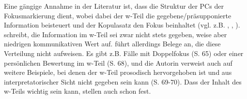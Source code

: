 Eine gängige Annahme in der Literatur ist, dass die Struktur der PCs der Fokusmarkierung  dient, wobei dabei der w-Teil die gegebene/präsupponierte Information beisteuert und der Kopulasatz den Fokus beinhaltet (vgl. z.B. \citealt{Prince1978}, \citealt{Collins1991}, \citealt{Lambrecht2001}). \citet[465-466]{Huddleston1984} schreibt, die Information im w-Teil sei zwar nicht stets gegeben, weise aber niedrigen kommunikativen Wert auf. \citet[65]{Guenthner2006} führt allerdings Belege an, die diese Verteilung nicht aufweisen. Es gibt z.B. Fälle mit Doppelfokus (S. 65) oder einer persönlichen Bewertung im w-Teil (S. 68), und die Autorin verweist auch auf weitere Beispiele, bei denen der w-Teil prosodisch hervorgehoben ist und aus interpretatorischer Sicht nicht gegeben sein kann (S. 69-70). Dass der Inhalt des w-Teils wichtig sein kann, stellen auch schon \citet{Weinert1996} fest.

